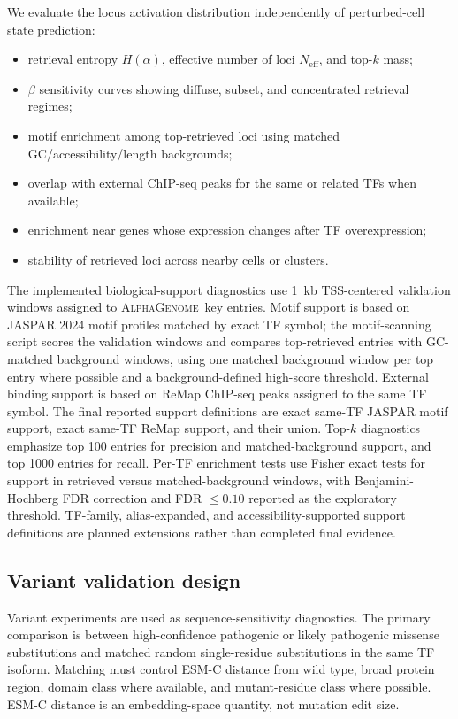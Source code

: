 \documentclass[11pt]{article}
\newcommand{\ag}{\textsc{AlphaGenome}}
\begin{document}
We evaluate the locus activation distribution independently of perturbed-cell state prediction:
\begin{itemize}
    \item retrieval entropy \(H(\alpha)\), effective number of loci \(N_{\mathrm{eff}}\), and top-\(k\) mass;
    \item \(\beta\) sensitivity curves showing diffuse, subset, and concentrated retrieval regimes;
    \item motif enrichment among top-retrieved loci using matched GC/accessibility/length backgrounds;
    \item overlap with external ChIP-seq peaks for the same or related TFs when available;
    \item enrichment near genes whose expression changes after TF overexpression;
    \item stability of retrieved loci across nearby cells or clusters.
\end{itemize}

The implemented biological-support diagnostics use 1~kb TSS-centered validation windows assigned to \ag\ key entries. Motif support is based on JASPAR 2024 motif profiles matched by exact TF symbol; the motif-scanning script scores the validation windows and compares top-retrieved entries with GC-matched background windows, using one matched background window per top entry where possible and a background-defined high-score threshold. External binding support is based on ReMap ChIP-seq peaks assigned to the same TF symbol. The final reported support definitions are exact same-TF JASPAR motif support, exact same-TF ReMap support, and their union. Top-\(k\) diagnostics emphasize top 100 entries for precision and matched-background support, and top 1000 entries for recall. Per-TF enrichment tests use Fisher exact tests for support in retrieved versus matched-background windows, with Benjamini-Hochberg FDR correction and FDR \(\leq 0.10\) reported as the exploratory threshold. TF-family, alias-expanded, and accessibility-supported support definitions are planned extensions rather than completed final evidence.

\subsection{Variant validation design}
\label{sec:variant_validation_design}

Variant experiments are used as sequence-sensitivity diagnostics. The primary comparison is between high-confidence pathogenic or likely pathogenic missense substitutions and matched random single-residue substitutions in the same TF isoform. Matching must control ESM-C distance from wild type, broad protein region, domain class where available, and mutant-residue class where possible. ESM-C distance is an embedding-space quantity, not mutation edit size.
\end{document}
